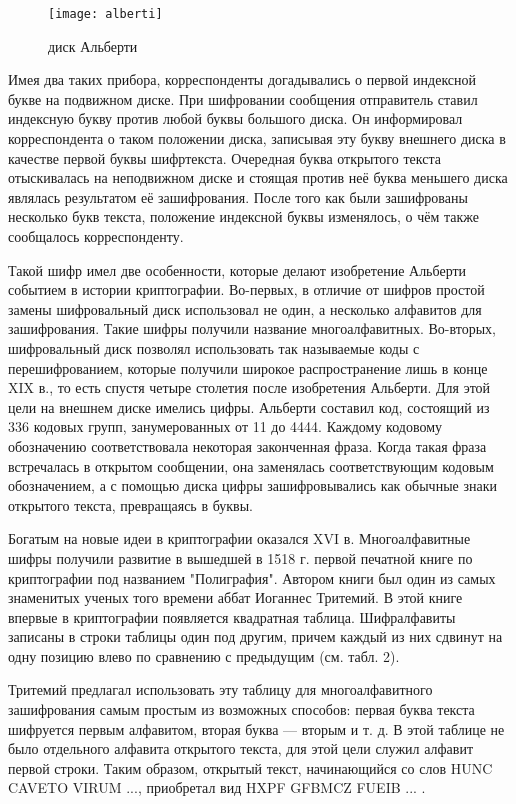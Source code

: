 \begin{figure}[H]
	\texttt{[image: alberti]}
	\centering
	\caption{диск Альберти}
\end{figure}


Имея два таких прибора, корреспонденты догадывались о первой индексной букве на подвижном диске. При шифровании сообщения отправитель ставил индексную букву против любой буквы большого диска. Он информировал корреспондента о таком положении диска, записывая эту букву внешнего диска в качестве первой буквы шифртекста. Очередная буква открытого текста отыскивалась на неподвижном диске и стоящая против неё буква меньшего диска являлась результатом её зашифрования. После того как были зашифрованы несколько букв текста, положение индексной буквы изменялось, о чём также сообщалось корреспонденту.

Такой шифр имел две особенности, которые делают изобретение Альберти событием в истории криптографии. Во-первых, в отличие от шифров простой замены шифровальный диск использовал не один, а несколько алфавитов для зашифрования. Такие шифры получили название многоалфавитных. Во-вторых, шифровальный диск позволял использовать так называемые коды с перешифрованием, которые получили широкое распространение лишь в конце XIX в., то есть спустя четыре столетия после изобретения Альберти. Для этой цели на внешнем диске имелись цифры. Альберти составил код, состоящий из 336 кодовых групп, занумерованных от 11 до 4444. Каждому кодовому обозначению соответствовала некоторая законченная фраза. Когда такая фраза встречалась в открытом сообщении, она заменялась соответствующим кодовым обозначением, а с помощью диска цифры зашифровы­вались как обычные знаки открытого текста, превращаясь в буквы.

Богатым на новые идеи в криптографии оказался XVI в. Многоалфавитные шифры получили развитие в вышедшей в 1518 г. первой печатной книге по криптографии под названием "Полиграфия". Автором книги был один из самых знаме­нитых ученых того времени аббат Иоганнес Тритемий. В этой книге впервые в криптографии появляется квадратная таблица. Шифралфавиты записаны в строки таблицы один под дру­гим, причем каждый из них сдвинут на одну позицию влево по сравнению с предыдущим (см. табл. 2).

Тритемий предлагал использовать эту таблицу для многоалфавитного зашифрования самым простым из возможных способов: первая буква текста шифруется первым алфавитом, вторая буква — вторым и т. д. В этой таблице не было отдельного алфавита открытого текста, для этой цели служил алфавит первой строки. Таким образом, открытый текст, начинающийся со слов HUNC CAVETO VIRUM ..., приобретал вид HXPF GFBMCZ FUEIB ... .

